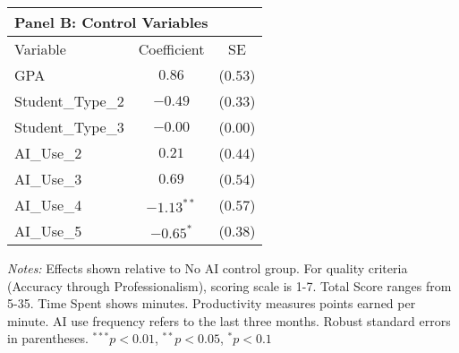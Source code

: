 \begin{table}[!htbp]
\vspace{0.3cm}

\begin{tabular}{lcc}
\multicolumn{3}{l}{\textbf{Panel B: Control Variables}} \\
\hline\hline
Variable & Coefficient & SE \\
\hline
GPA & $0.86$ & ($0.53$) \\
Student_Type_2 & $-0.49$ & ($0.33$) \\
Student_Type_3 & $-0.00$ & ($0.00$) \\
AI_Use_2 & $0.21$ & ($0.44$) \\
AI_Use_3 & $0.69$ & ($0.54$) \\
AI_Use_4 & $-1.13^{**}$ & ($0.57$) \\
AI_Use_5 & $-0.65^{*}$ & ($0.38$) \\
\hline
\end{tabular}
\begin{tablenotes}
\small
\item \textit{Notes:} Effects shown relative to No AI control group. For quality criteria (Accuracy through Professionalism), scoring scale is 1-7. Total Score ranges from 5-35. Time Spent shows minutes. Productivity measures points earned per minute. AI use frequency refers to the last three months. Robust standard errors in parentheses. $^{***}p<0.01$, $^{**}p<0.05$, $^{*}p<0.1$
\end{tablenotes}
\end{table}